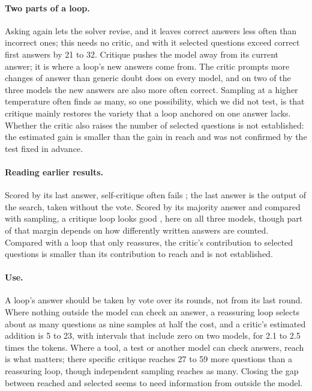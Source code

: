 \documentclass[11pt]{article}
\begin{document}
\paragraph{Two parts of a loop.}
Asking again lets the solver revise, and it leaves correct answers less often than incorrect ones; this needs no critic, and with it selected questions exceed correct first answers by 21 to 32.
Critique pushes the model away from its current answer; it is where a loop's new answers come from. The critic prompts more changes of answer than generic doubt does on every model, and on two of the three models the new answers are also more often correct.
Sampling at a higher temperature often finds as many, so one possibility, which we did not test, is that critique mainly restores the variety that a loop anchored on one answer lacks.
Whether the critic also raises the number of selected questions is not established: the estimated gain is smaller than the gain in reach and was not confirmed by the test fixed in advance.

\paragraph{Reading earlier results.}
Scored by its last answer, self-critique often fails \citep{huang2024cannot,stechly2024selfverification}; the last answer is the output of the search, taken without the vote.
Scored by its majority answer and compared with sampling, a critique loop looks good \citep{bilal2026refining}, here on all three models, though part of that margin depends on how differently written answers are counted.
Compared with a loop that only reassures, the critic's contribution to selected questions is smaller than its contribution to reach and is not established.

\paragraph{Use.}
A loop's answer should be taken by vote over its rounds, not from its last round.
Where nothing outside the model can check an answer, a reassuring loop selects about as many questions as nine samples at half the cost, and a critic's estimated addition is 5 to 23, with intervals that include zero on two models, for 2.1 to 2.5 times the tokens.
Where a tool, a test or another model can check answers, reach is what matters; there specific critique reaches 27 to 59 more questions than a reassuring loop, though independent sampling reaches as many.
Closing the gap between reached and selected seems to need information from outside the model.
\end{document}
